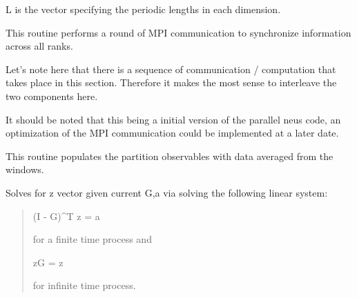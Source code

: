 \documentclass[letterpaper,10pt,english]{sphinxmanual}
\begin{document}
\begin{fulllineitems}
\begin{fulllineitems}
L is the vector specifying the periodic lengths in each dimension.

\end{fulllineitems}


\begin{fulllineitems}
\label{applications/applications.doc:partition.partition.communicateMPI}
This routine performs a round of MPI communication to synchronize information across all ranks.

Let's note here that there is a sequence of communication / computation that takes place in this section.
Therefore it makes the most sense to interleave the two components here.

It should be noted that this being a initial version of the parallel neus code, an optimization of the
MPI communication could be implemented at a later date.

\end{fulllineitems}


\begin{fulllineitems}
\label{applications/applications.doc:partition.partition.computeObservables}
This routine populates the partition observables with data averaged from the windows.

\end{fulllineitems}


\begin{fulllineitems}
\label{applications/applications.doc:partition.partition.computeZ}
Solves for z vector given current G,a via solving the following linear 
system:
\begin{quote}

(I - G)\textasciicircum{}T z = a

for a finite time process and

zG = z

for infinite time process.
\end{quote}


\end{fulllineitems}
\end{fulllineitems}
\end{document}

